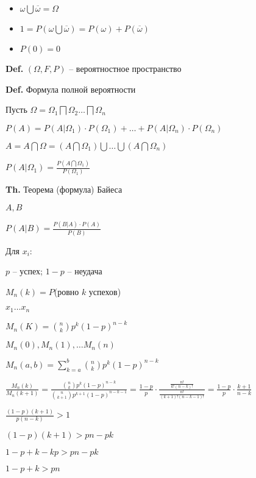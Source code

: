 \documentclass[14pt, letter paper]{article}
\begin{document}
\begin{itemize}
    \item $\omega \bigcup \overline{\omega} = \Omega$
    \item $1 = P(\omega \bigcup \overline{\omega}) = P(\omega) + P(\overline{\omega})$
    \item $P(0) = 0$
\end{itemize}

\textbf{Def.} $(\Omega, F, P)$ -- вероятностное пространство

\vspace{5mm}

\textbf{Def.} Формула полной вероятности

Пусть $\Omega = \Omega_1 \bigsqcap \Omega_2 \ldots \bigsqcap \Omega_n$

$P(A) = P(A | \Omega_1) \cdot P(\Omega_1) + \ldots + P(A | \Omega_n) \cdot P(\Omega_n)$

$A = A \bigcap \Omega = (A \bigcap \Omega_1) \bigcup \ldots \bigcup (A \bigcap \Omega_n)$

$P(A | \Omega_1) = \frac{P(A \bigcap \Omega_1)}{P(\Omega_1)}$

\vspace{5mm}

\textbf{Th.} Теорема (формула) Байеса 

$A, B$

$P(A | B) = \frac{P(B|A) \cdot P(A)}{P(B)}$

\vspace{5mm}

Для $x_i$:

$p$ -- успех; $1 - p$ -- неудача

$M_n(k) = P$(ровно $k$ успехов)

$x_1 \ldots x_n$

$M_n(K) = {n \choose k} p^k (1-p)^{n-k}$

$M_n(0), M_n(1), \ldots M_n(n)$

$M_n(a, b) = \sum\limits_{k=a}^b {n \choose k} p^k (1-p)^{n-k}$

$\frac{M_n(k)}{M_n(k+1)} = \frac{{n \choose k} p^k (1-p)^{n-k}}{{n \choose k + 1} p^{k+1} (1-p)^{n-k-1}} = \frac{1-p}{p} \cdot \frac{\frac{n!}{k!(n-k)!}}{\frac{n!}{(k+1)!(n-k-1)!}} = \frac{1-p}{p} \cdot \frac{k+1}{n-k}$

$\frac{(1-p)(k+1)}{p(n-k)} > 1$

$(1-p)(k+1) > pn - pk$

$1 - p + k - kp > pn - pk$

$1 - p + k > pn$
\end{document}
